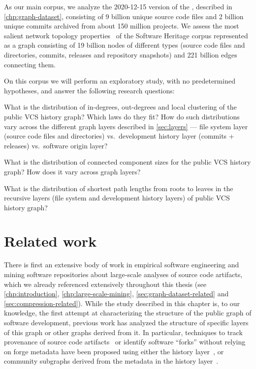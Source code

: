 As our main corpus, we analyze the 2020-12-15 version of the \SWHGD{},
described in \cref{chp:graph-dataset}, consisting of 9 billion unique source
code files and 2 billion unique commits archived from about 150 million
projects.  We assess the most salient network topology
properties~\cite{barabasi2002networkstats} of the Software Heritage corpus
represented as a graph consisting of 19 billion nodes of different types
(source code files and directories, commits, releases and repository snapshots)
and 221 billion edges connecting them.

On this corpus we will perform an exploratory study, with no predetermined
hypotheses, and answer the following research questions:

\begin{researchquestion}%
\label{rq:degrees}
What is the distribution of in-degrees, out-degrees and local clustering of the
public VCS history graph? Which laws do they fit?
How do such distributions vary across the different graph layers described in
\cref{sec:layers} --- file system layer (source code files and directories)
vs.\ development history layer (commits + releases) vs.\ software origin
layer?
\end{researchquestion}

\begin{researchquestion}%
\label{rq:ccs}
What is the distribution of connected component sizes for the public VCS
history graph?  How does it vary across graph layers?
\end{researchquestion}

\begin{researchquestion}%
\label{rq:paths}
What is the distribution of shortest path lengths from roots to leaves in the
recursive layers (file system and development history layers) of public VCS
history graph?
\end{researchquestion}


\section{Related work}%
\label{sec:topology-related}

There is first an extensive body of work in empirical software engineering and
mining software repositories about large-scale analyses of source code
artifacts, which we already referenced extensively throughout this thesis (see
\cref{chp:introduction}, \cref{chp:large-scale-mining},
\cref{sec:graph-dataset-related} and \cref{sec:compression-related}).
While the study described in this chapter is, to our knowledge, the first
attempt at characterizing the structure of the public graph of software
development, previous work has analyzed the structure of specific layers of
this graph or other graphs derived from it. In particular, techniques to track
provenance of source code artifacts~\cite{swh-provenance-emse} or identify
software ``forks'' without relying on forge metadata have been proposed using
either the history layer~\cite{swh-msr2020-forking}, or community subgraphs
derived from the metadata in the history layer~\cite{mockus2020complete}.


